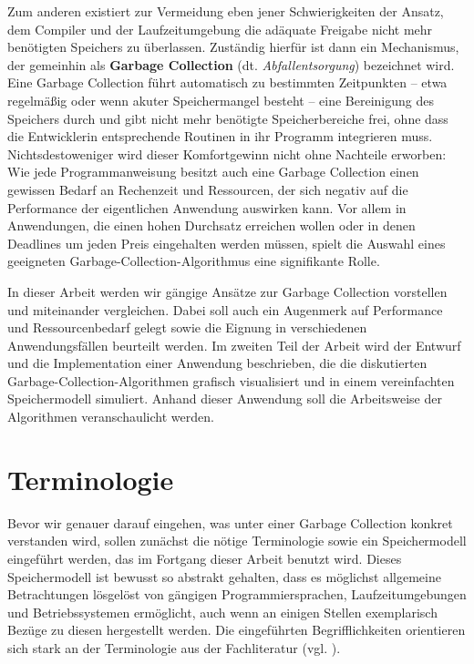 Zum anderen existiert zur Vermeidung eben jener Schwierigkeiten der Ansatz, dem Compiler und der Laufzeitumgebung die adäquate Freigabe nicht mehr benötigten Speichers zu überlassen.
Zuständig hierfür ist dann ein Mechanismus, der gemeinhin als \textbf{Garbage Collection} (dt. \textit{Abfallentsorgung}) bezeichnet wird.
Eine Garbage Collection führt automatisch zu bestimmten Zeitpunkten -- etwa regelmäßig oder wenn akuter Speichermangel besteht -- eine Bereinigung des Speichers durch und gibt nicht mehr benötigte Speicherbereiche frei, ohne dass die Entwicklerin entsprechende Routinen in ihr Programm integrieren muss.
Nichtsdestoweniger wird dieser Komfortgewinn nicht ohne Nachteile erworben:
Wie jede Programmanweisung besitzt auch eine Garbage Collection einen gewissen Bedarf an Rechenzeit und Ressourcen, der sich negativ auf die Performance der eigentlichen Anwendung auswirken kann.
Vor allem in Anwendungen, die einen hohen Durchsatz erreichen wollen oder in denen Deadlines um jeden Preis eingehalten werden müssen, spielt die Auswahl eines geeigneten Garbage-Collection-Algorithmus eine signifikante Rolle.

In dieser Arbeit werden wir gängige Ansätze zur Garbage Collection vorstellen und miteinander vergleichen.
Dabei soll auch ein Augenmerk auf Performance und Ressourcenbedarf gelegt sowie die Eignung in verschiedenen Anwendungsfällen beurteilt werden.
Im zweiten Teil der Arbeit wird der Entwurf und die Implementation einer Anwendung beschrieben, die die diskutierten Garbage-Collection-Algorithmen grafisch visualisiert und in einem vereinfachten Speichermodell simuliert.
Anhand dieser Anwendung soll die Arbeitsweise der Algorithmen veranschaulicht werden.




\section{Terminologie}
\label{sec:intro:terminologie}
Bevor wir genauer darauf eingehen, was unter einer Garbage Collection konkret verstanden wird, sollen zunächst die nötige Terminologie sowie ein Speichermodell eingeführt werden, das im Fortgang dieser Arbeit benutzt wird.
Dieses Speichermodell ist bewusst so abstrakt gehalten, dass es möglichst allgemeine Betrachtungen lösgelöst von gängigen Programmiersprachen, Laufzeitumgebungen und Betriebssystemen ermöglicht, auch wenn an einigen Stellen exemplarisch Bezüge zu diesen hergestellt werden.
Die eingeführten Begrifflichkeiten orientieren sich stark an der Terminologie aus der Fachliteratur (vgl. \cite[Kap. 1]{jones-lins}).

